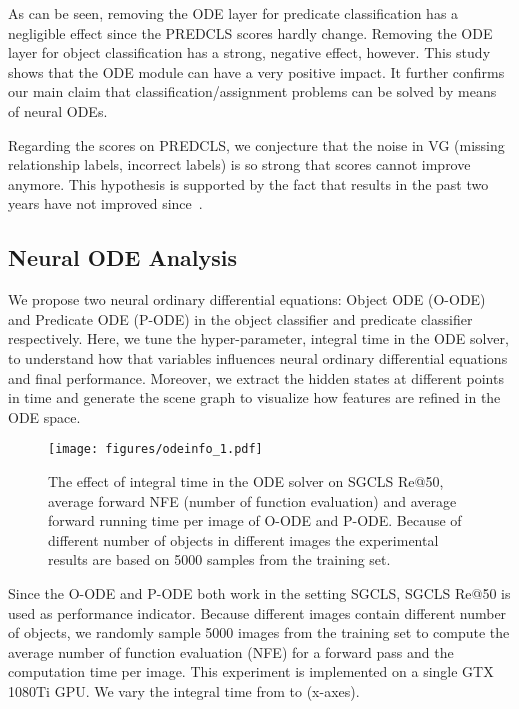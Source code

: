 \documentclass[runningheads]{llncs}
\begin{document}
As can be seen, removing the ODE layer for predicate classification has a negligible effect since the PREDCLS scores hardly change. Removing the ODE layer for object classification has a strong, negative effect, however. This study shows that the ODE module can have a very positive impact. It further confirms our main claim that classification/assignment problems can be solved by means of neural ODEs. 

Regarding the scores on PREDCLS, we conjecture that the noise in VG (missing relationship labels, incorrect labels) is so strong that scores cannot improve anymore. This hypothesis is supported by the fact that results in the past two years have not improved since~\cite{zellers2018neural}.



\subsection{Neural ODE Analysis}
\label{subsec:time}

We propose two neural ordinary differential equations: Object ODE (O-ODE) and Predicate ODE (P-ODE) in the object classifier and predicate classifier respectively. Here, we tune the hyper-parameter, integral time  in the ODE solver, to understand how that variables  influences neural ordinary differential equations and final performance. Moreover, we extract the hidden states at different points in time and generate the scene graph to visualize how features are refined in the ODE space. 

\begin{figure*}[!ht]
\centering
    \texttt{[image: figures/odeinfo\_1.pdf]}
    \caption{The effect of integral time in the ODE solver on SGCLS Re@50, average forward NFE (number of function evaluation) and average forward running time per image of O-ODE and P-ODE. Because of different number of objects in different images the experimental results are based on 5000 samples from the training set.} \label{fig:ode_info}
\end{figure*}

Since the O-ODE and P-ODE both work in the setting SGCLS, SGCLS Re@50 is used as performance indicator. Because different images contain different number of objects, we randomly sample 5000 images from the training set to compute the average number of function evaluation (NFE) for a forward pass and the computation time per image. This experiment is implemented on a single GTX 1080Ti GPU. 
We vary the integral time  from  to  (x-axes). 
\end{document}
